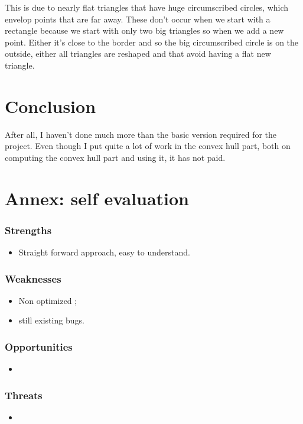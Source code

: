 \documentclass[a4paper,11pt]{article}%
\begin{document}
This is due to nearly flat triangles that have huge circumscribed circles, which envelop points that are far away. These don't occur when we start with a rectangle because we start with only two big triangles so when we add a new point. Either it's close to the border and so the big circumscribed circle is on the outside,  either all triangles are reshaped and that avoid having a flat new triangle.

\section{Conclusion}
After all, I haven't done much more than the basic version required for the project. Even though I put quite a lot of work in the convex hull part, both on computing the convex hull part and using it, it has not paid.


\clearpage %

\appendix %


\section{Annex: self evaluation}

\subsubsection*{Strengths}
\begin{itemize}
\item Straight forward approach, easy to understand.
\end{itemize}

\subsubsection*{Weaknesses}
\begin{itemize}
\item Non optimized ;
\item still existing bugs.
\end{itemize}

\subsubsection*{Opportunities}
\begin{itemize}
\item 
\end{itemize}

\subsubsection*{Threats}
\begin{itemize}
\item 
\end{itemize}
\end{document}
